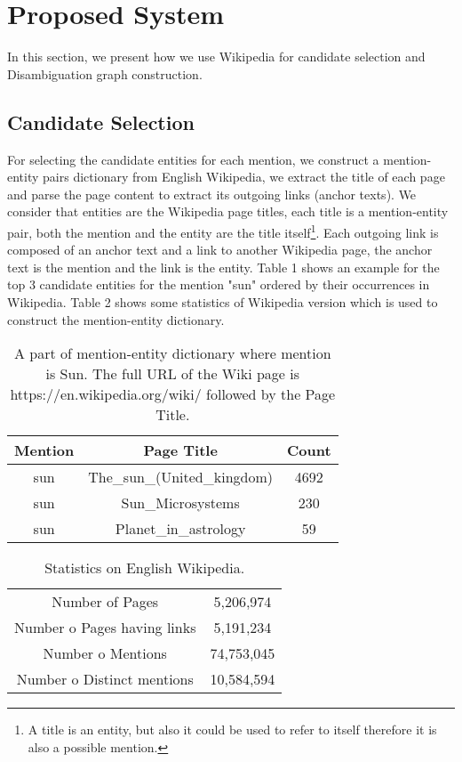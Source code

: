 \documentclass{llncs}
\begin{document}
\section{Proposed System}

In this section, we present how we use Wikipedia for candidate selection and Disambiguation graph construction.
 \subsection{Candidate Selection}
 For selecting the candidate entities for each mention, we construct a mention-entity pairs dictionary from English Wikipedia, we extract the title of each page and parse the page content to extract its outgoing links (anchor texts). We consider that entities are the Wikipedia page titles, each title  is a mention-entity pair, both the mention and the entity are the title itself\footnote{A title is an entity, but also it could be used to refer to itself therefore it is  also a possible mention.}. Each outgoing link is composed of an anchor text and a link to another Wikipedia page, the anchor text is the mention and the link is the entity. Table 1 shows an example for the  top 3 candidate entities for the mention "sun"  ordered by their occurrences in Wikipedia.  Table 2 shows some statistics of  Wikipedia version which is used to construct the mention-entity dictionary.

 \begin{table}[th!]
\centering
\begin{tabular}{|c|c|c|}
\hline
Mention & Page Title& Count\\
\hline
 sun    &  The\_sun\_(United\_kingdom)                                                                      &     4692\\
 sun    &  Sun\_Microsystems                                                                    &      230\\
 sun    &  Planet\_in\_astrology                                                                     &   59 \\
\hline
\end{tabular}
\caption{A part of mention-entity dictionary where mention is Sun. The full URL of the Wiki page is https://en.wikipedia.org/wiki/ followed by the  Page Title. }
\end{table}

\begin{table}[h!]
\centering
\begin{tabular}{|c|c|}
\hline

Number of Pages & 5,206,974\\
Number o Pages having links & 5,191,234\\
 Number o Mentions & 74,753,045\\
  Number o Distinct mentions  &10,584,594\\
\hline

\end{tabular}
\caption{Statistics on English Wikipedia.}
\end{table}
\end{document}
